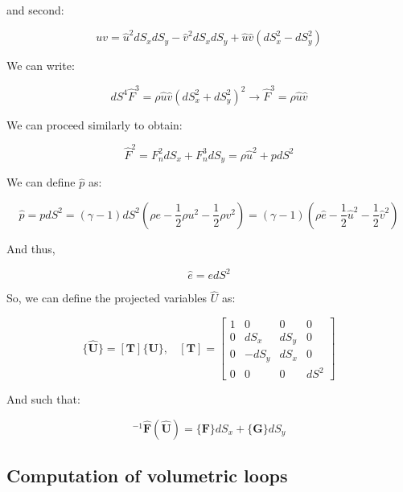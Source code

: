\documentclass[10pt,a4paper]{article}
\begin{document}
and second:

\begin{equation}
uv = \hat{u}^2 dS_x dS_y - \hat{v}^2 dS_x dS_y + \hat{u}\hat{v}(dS_x^2 - dS_y^2)	
\end{equation}

We can write:

\begin{equation}
dS^4 \hat{F}^3= \rho \hat{u}\hat{v} (dS_x^2 + dS_y^2)^2 \rightarrow \hat{F}^3 = \rho \hat{u}\hat{v}
\end{equation}

We can proceed similarly to obtain:

\begin{equation}
\hat{F}^2 = F_n^2 dS_x + F_n^3 dS_y = \rho \hat{u}^2 + p dS^{2}	
\end{equation}

We can define $\hat{p}$ as:

\begin{equation}
\hat{p}	= p dS^2 = (\gamma-1)dS^2(\rho e - \frac{1}{2}\rho u^2 - \frac{1}{2}\rho v^2) = (\gamma-1)(\rho \hat{e}-\frac{1}{2}\hat{u}^2 - \frac{1}{2}\hat{v}^2)
\end{equation}

And thus,

\begin{equation}
\hat{e} = e dS^2	
\end{equation}


So, we can define the projected variables $\hat{U}$ as:

\begin{equation}
\{\boldsymbol{\hat{U}}\}=[\boldsymbol{T}]\{\boldsymbol{U}\}, ~~~~[\boldsymbol{T}] = \left[\begin{array}{cccc}1 & 0 & 0 & 0 \\ 0 & dS_x & dS_y & 0 \\ 0 & -dS_y & dS_x & 0 \\ 0 & 0 & 0 & dS^2 \end{array}\right] 	
\end{equation}

And such that:

\begin{equation}
 [\boldsymbol{T}]^{-1}\boldsymbol{\hat{F}}(\hat{\boldsymbol{U}})	 = \{\boldsymbol{F}\} dS_x + \{\boldsymbol{G}\} dS_y
\end{equation}


\subsection{Computation of volumetric loops}
\end{document}
